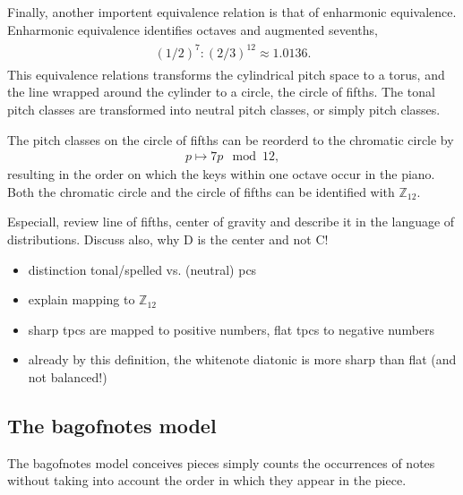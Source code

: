 \documentclass[letterpaper,10pt,english]{sphinxmanual}
\begin{document}
\sphinxAtStartPar
Finally, another importent equivalence relation is that of enharmonic
equivalence. Enharmonic equivalence identifies octaves and augmented
sevenths,
\begin{equation*}
\begin{split}\begin{aligned}
    (1/2)^7 : (2/3)^12 \approx 1.0136.\end{aligned}\end{split}
\end{equation*}
\sphinxAtStartPar
This equivalence relations transforms the cylindrical pitch space to a
torus, and the line wrapped around the cylinder to a circle, the circle
of fifths. The tonal pitch classes are transformed into neutral pitch
classes, or simply pitch classes.

\sphinxAtStartPar
The pitch classes on the circle of fifths can be reorderd to the
chromatic circle by
\begin{equation*}
\begin{split}p\mapsto 7p\mod 12,\end{split}
\end{equation*}
\sphinxAtStartPar
resulting in the order on which the keys within one octave occur in the
piano. Both the chromatic circle and the circle of fifths can be
identified with \(\mathbb Z_{12}\).

\sphinxAtStartPar
Especiall, review line of
fifths, center of gravity and describe it in the language of
distributions. Discuss also, why D is the center and not C!
\begin{itemize}
\item {} 
\sphinxAtStartPar
distinction tonal/spelled vs. (neutral) pcs

\item {} 
\sphinxAtStartPar
explain mapping to \(\mathbb Z_{12}\)

\item {} 
\sphinxAtStartPar
sharp tpcs are mapped to positive numbers, flat tpcs to negative numbers

\item {} 
\sphinxAtStartPar
already by this definition, the white\sphinxhyphen{}note diatonic is more sharp than flat (and not balanced!)

\end{itemize}


\subsection{The bag\sphinxhyphen{}of\sphinxhyphen{}notes model}
\label{\detokenize{5_notes:the-bag-of-notes-model}}
\sphinxAtStartPar
The bag\sphinxhyphen{}of\sphinxhyphen{}notes model conceives pieces simply counts the occurrences of
notes without taking into account the order in which they appear in the
piece.
\end{document}
